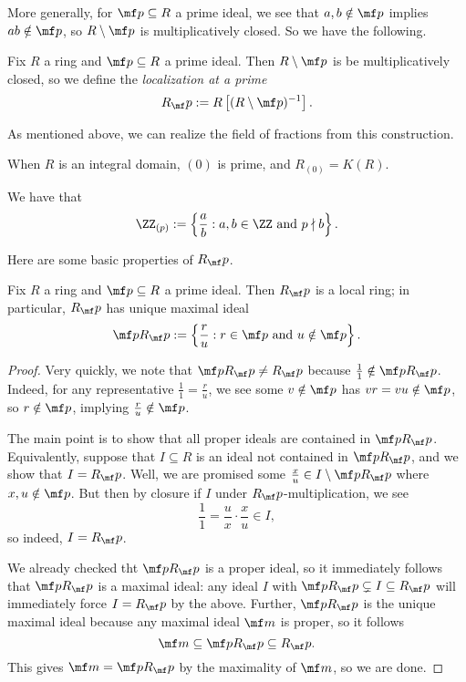 More generally, for $\mf p\subseteq R$ a prime ideal, we see that $a,b\notin\mf p$ implies $ab\notin\mf p$, so $R\setminus\mf p$ is multiplicatively closed. So we have the following.
\begin{definition}
	Fix $R$ a ring and $\mf p\subseteq R$ a prime ideal. Then $R\setminus\mf p$ is be multiplicatively closed, so we define the \textit{localization at a prime}
	\[R_\mf p:=R\left[(R\setminus\mf p)^{-1}\right].\]
\end{definition}
As mentioned above, we can realize the field of fractions from this construction.
\begin{example}
	When $R$ is an integral domain, $(0)$ is prime, and $R_{(0)}=K(R)$.
\end{example}
\begin{example}
	We have that
	\[\ZZ_{(p)}:=\left\{\frac ab:a,b\in\ZZ\text{ and }p\nmid b\right\}.\]
\end{example}
Here are some basic properties of $R_\mf p$.
\begin{proposition}
	Fix $R$ a ring and $\mf p\subseteq R$ a prime ideal. Then $R_\mf p$ is a local ring; in particular, $R_\mf p$ has unique maximal ideal
	\[\mf pR_\mf p:=\left\{\frac ru:r\in\mf p\text{ and }u\notin\mf p\right\}.\]
\end{proposition}
\begin{proof}
	Very quickly, we note that $\mf pR_\mf p\ne R_\mf p$ because $\frac11\notin\mf pR_\mf p$. Indeed, for any representative $\frac11=\frac ru$, we see some $v\notin\mf p$ has $vr=vu\notin\mf p$, so $r\notin\mf p$, implying $\frac ru\notin\mf p$.
	
	The main point is to show that all proper ideals are contained in $\mf pR_\mf p$. Equivalently, suppose that $I\subseteq R$ is an ideal not contained in $\mf pR_\mf p$, and we show that $I=R_\mf p$. Well, we are promised some $\frac xu\in I\setminus\mf pR_\mf p$ where $x,u\notin\mf p$. But then by closure if $I$ under $R_\mf p$-multiplication, we see
	\[\frac11=\frac ux\cdot\frac xu\in I,\]
	so indeed, $I=R_\mf p$.

	We already checked tht $\mf pR_\mf p$ is a proper ideal, so it immediately follows that $\mf pR_\mf p$ is a maximal ideal: any ideal $I$ with $\mf pR_\mf p\subsetneq I\subseteq R_\mf p$ will immediately force $I=R_\mf p$ by the above. Further, $\mf pR_\mf p$ is the unique maximal ideal because any maximal ideal $\mf m$ is proper, so it follows
	\[\mf m\subseteq\mf pR_\mf p\subseteq R_\mf p.\]
	This gives $\mf m=\mf pR_\mf p$ by the maximality of $\mf m$, so we are done.
\end{proof}
